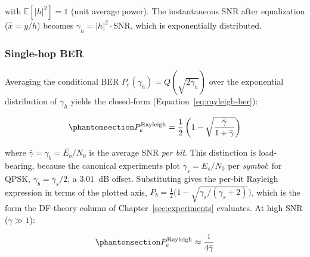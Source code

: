 with \(\mathbb{E}[|h|^2] = 1\) (unit average power). The instantaneous SNR after equalization (\(\hat{x} = y/h\)) becomes \(\gamma_h = |h|^2 \cdot \text{SNR}\), which is exponentially distributed.

\subsubsection{Single-hop BER}\label{sec:rayleigh-single-hop-ber}
Averaging the conditional BER \(P_e(\gamma_h) = Q(\sqrt{2\gamma_h})\) over the exponential distribution of \(\gamma_h\) yields the closed-form \cite[Ch.~13]{ProakisSalehi2008DigitalComm} (Equation~\ref{eq:rayleigh-ber}):

\begin{equation}\protect\phantomsection\label{eq:rayleigh-ber}{P_e^{\text{Rayleigh}} = \frac{1}{2}\left(1 - \sqrt{\frac{\bar{\gamma}}{1 + \bar{\gamma}}}\right)
}\end{equation}

where \(\bar{\gamma} = \gamma_b = \bar{E_b}/N_0\) is the average SNR \emph{per bit}. This distinction is load-bearing, because the canonical experiments plot \(\gamma_s = E_s/N_0\) per \emph{symbol}: for QPSK, \(\gamma_b = \gamma_s / 2\), a \(3.01\)~dB offset. Substituting gives the per-bit Rayleigh expression in terms of the plotted axis, \(P_b = \tfrac{1}{2}\bigl(1 - \sqrt{\gamma_s/(\gamma_s+2)}\bigr)\), which is the form the DF-theory column of Chapter~\ref{sec:experiments} evaluates. At high SNR (\(\bar{\gamma} \gg 1\)):

\begin{equation}\protect\phantomsection\label{eq:rayleigh-ber-approx}{P_e^{\text{Rayleigh}} \approx \frac{1}{4\bar{\gamma}}
}\end{equation}

